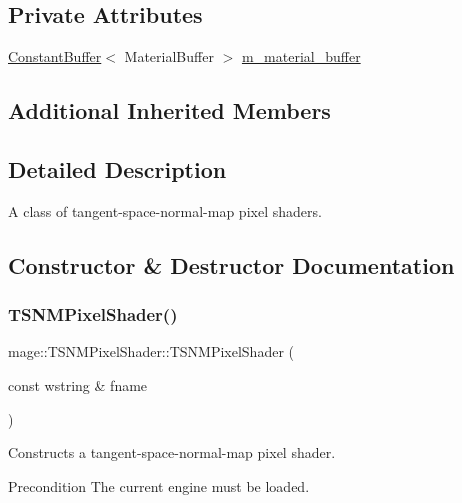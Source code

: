 \subsection*{Private Attributes}
\begin{DoxyCompactItemize}
\item 
\hyperlink{structmage_1_1_constant_buffer}{Constant\+Buffer}$<$ Material\+Buffer $>$ \hyperlink{classmage_1_1_t_s_n_m_pixel_shader_a44a37625ffb8de2ace98b9457972e030}{m\+\_\+material\+\_\+buffer}
\end{DoxyCompactItemize}
\subsection*{Additional Inherited Members}


\subsection{Detailed Description}
A class of tangent-\/space-\/normal-\/map pixel shaders. 

\subsection{Constructor \& Destructor Documentation}
\hypertarget{classmage_1_1_t_s_n_m_pixel_shader_a0081c5ca9470521f2f7d01dfcfe1996d}{}\label{classmage_1_1_t_s_n_m_pixel_shader_a0081c5ca9470521f2f7d01dfcfe1996d} 
\subsubsection{\texorpdfstring{T\+S\+N\+M\+Pixel\+Shader()}{TSNMPixelShader()}\hspace{0.1cm}{\footnotesize\ttfamily [1/6]}}
{\footnotesize\ttfamily mage\+::\+T\+S\+N\+M\+Pixel\+Shader\+::\+T\+S\+N\+M\+Pixel\+Shader (\begin{DoxyParamCaption}\item[{const wstring \&}]{fname }\end{DoxyParamCaption})\hspace{0.3cm}{\ttfamily [explicit]}}

Constructs a tangent-\/space-\/normal-\/map pixel shader.

\begin{DoxyPrecond}{Precondition}
The current engine must be loaded. 
\end{DoxyPrecond}

